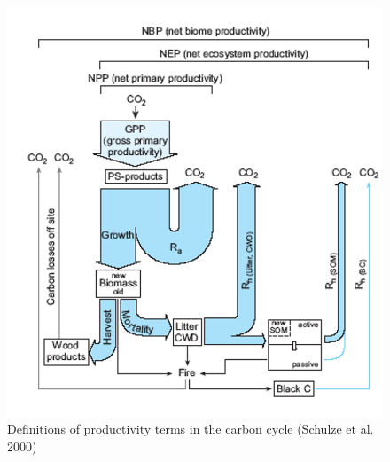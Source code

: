 \documentclass[
  12pt,
  oneside]{book}
\begin{document}
\begin{figure}

{\centering \includegraphics[width=0.8\linewidth]{figures/chap5/f53_GPP_NBP} 

}

\caption{Definitions of productivity terms in the carbon cycle (Schulze et al. 2000)}\label{fig:f53}
\end{figure}
\end{document}
